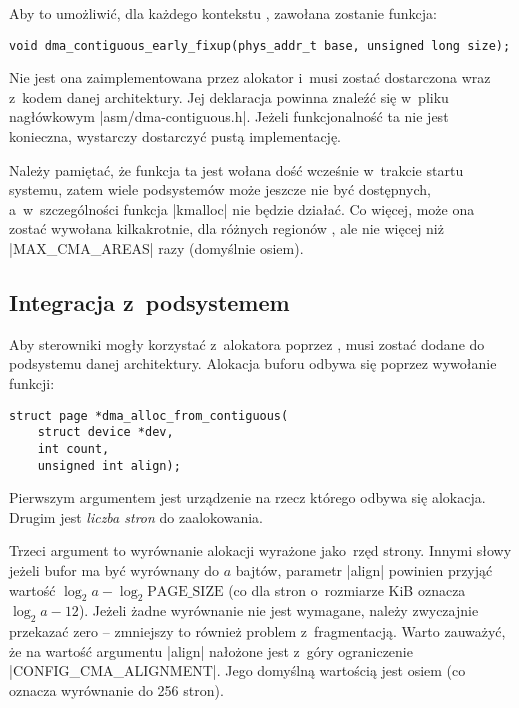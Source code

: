 Aby to umożliwić, dla każdego kontekstu , zawołana zostanie funkcja:

\begin{lstlisting}
void dma_contiguous_early_fixup(phys_addr_t base, unsigned long size);
\end{lstlisting}

Nie jest ona zaimplementowana przez alokator  i~musi zostać
dostarczona wraz z~kodem danej architektury.  Jej deklaracja powinna
znaleźć się w~pliku nagłówkowym \code|asm/dma-contiguous.h|.  Jeżeli
funkcjonalność ta nie jest konieczna, wystarczy dostarczyć pustą
implementację.

Należy pamiętać, że funkcja ta jest wołana dość wcześnie w~trakcie
startu systemu, zatem wiele podsystemów może jeszcze nie być
dostępnych, a~w~szczególności funkcja \code|kmalloc| nie będzie
działać.  Co więcej, może ona zostać wywołana kilkakrotnie, dla
różnych regionów , ale nie więcej niż \code|MAX_CMA_AREAS| razy
(domyślnie osiem).

\subsection{Integracja z~podsystemem }\label{sec:usage-integrate}

Aby sterowniki mogły korzystać z~alokatora  poprzez  , 
musi zostać dodane do podsystemu  danej architektury.  Alokacja
buforu  odbywa się poprzez wywołanie funkcji:

\begin{lstlisting}
struct page *dma_alloc_from_contiguous(
	struct device *dev,
	int count,
	unsigned int align);
\end{lstlisting}

Pierwszym argumentem jest urządzenie na rzecz którego odbywa się
alokacja.  Drugim jest \emph{liczba stron} do zaalokowania.

Trzeci argument to wyrównanie alokacji wyrażone jako~rzęd strony.
Innymi słowy jeżeli bufor ma być wyrównany do $a$ bajtów, parametr
\code|align| powinien przyjąć wartość $\log_2 a - \log_2
\mathrm{PAGE\_SIZE}$ (co dla stron o~rozmiarze \unit[4096]{KiB}
oznacza $\log_2 a - 12$).  Jeżeli żadne wyrównanie nie jest wymagane,
należy zwyczajnie przekazać zero -- zmniejszy to również problem
z~fragmentacją.  Warto zauważyć, że na wartość argumentu \code|align|
nałożone jest z~góry ograniczenie \code|CONFIG_CMA_ALIGNMENT|.  Jego
domyślną wartością jest osiem (co oznacza wyrównanie do 256 stron).

